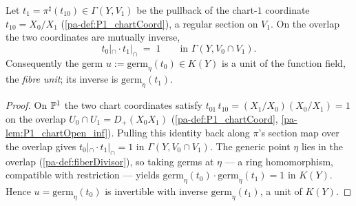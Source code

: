 \begin{definition}
  \label{pa-def:fiberCoordUnit}
  \leanok

  Let \(t_1 = \pi^{\sharp}(t_{10}) \in \Gamma(Y, V_1)\) be the pullback of the chart-\(1\) coordinate
  \(t_{10} = X_0/X_1\) (\ref{pa-def:P1_chartCoord}), a regular section on \(V_1\). On the overlap the
  two coordinates are mutually inverse,
  \[
    t_0|_{\cap} \cdot t_1|_{\cap} \;=\; 1 \qquad \text{in } \Gamma(Y, V_0 \cap V_1).
  \]
  Consequently the germ \(u := \mathrm{germ}_{\eta}(t_0) \in K(Y)\) is a unit of the function field,
  the \emph{fibre unit}; its inverse is \(\mathrm{germ}_{\eta}(t_1)\).
\end{definition}
\begin{proof}
  \leanok
  On \(\mathbb{P}^1\) the two chart coordinates satisfy \(t_{01}\,t_{10} = (X_1/X_0)(X_0/X_1) = 1\) on the
  overlap \(U_0 \cap U_1 = D_+(X_0 X_1)\) (\ref{pa-def:P1_chartCoord}, \ref{pa-lem:P1_chartOpen_inf}).
  Pulling this identity back along \(\pi\)'s section map over the overlap gives \(t_0|_{\cap} \cdot
  t_1|_{\cap} = 1\) in \(\Gamma(Y, V_0 \cap V_1)\). The generic point \(\eta\) lies in the overlap
  (\ref{pa-def:fiberDivisor}), so taking germs at \(\eta\) --- a ring homomorphism, compatible with
  restriction --- yields \(\mathrm{germ}_{\eta}(t_0)\cdot \mathrm{germ}_{\eta}(t_1) = 1\) in
  \(K(Y)\). Hence \(u = \mathrm{germ}_{\eta}(t_0)\) is invertible with inverse
  \(\mathrm{germ}_{\eta}(t_1)\), a unit of \(K(Y)\).
\end{proof}

